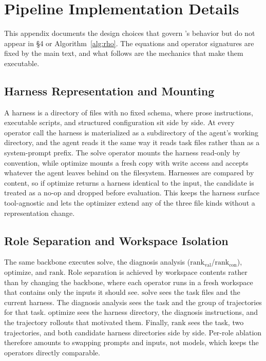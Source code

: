 \section{Pipeline Implementation Details}\label{app:pipeline}

 This appendix documents the design choices that govern \method{}'s behavior but do not appear in \S 4 or Algorithm~\ref{alg:rho}. The equations and operator signatures are fixed by the main text, and what follows are the mechanics that make them executable.

\subsection{Harness Representation and Mounting}

 A harness is a directory of files with no fixed schema, where prose instructions, executable scripts, and structured configuration sit side by side. At every operator call the harness is materialized as a subdirectory of the agent's working directory, and the agent reads it the same way it reads task files rather than as a system-prompt prefix. The $\mathrm{solve}$ operator mounts the harness read-only by convention, while $\mathrm{optimize}$ mounts a fresh copy with write access and accepts whatever the agent leaves behind on the filesystem. Harnesses are compared by content, so if $\mathrm{optimize}$ returns a harness identical to the input, the candidate is treated as a no-op and dropped before evaluation. This keeps the harness surface tool-agnostic and lets the optimizer extend any of the three file kinds without a representation change.

\subsection{Role Separation and Workspace Isolation}

 The same backbone executes $\mathrm{solve}$, the diagnosis analysis ($\mathrm{rank}_{\mathrm{val}}$/$\mathrm{rank}_{\mathrm{con}}$), $\mathrm{optimize}$, and $\mathrm{rank}$. Role separation is achieved by workspace contents rather than by changing the backbone, where each operator runs in a fresh workspace that contains only the inputs it should see. $\mathrm{solve}$ sees the task files and the current harness. The diagnosis analysis sees the task and the group of trajectories for that task. $\mathrm{optimize}$ sees the harness directory, the diagnosis instructions, and the trajectory rollouts that motivated them. Finally, $\mathrm{rank}$ sees the task, two trajectories, and both candidate harness directories side by side. Per-role ablation therefore amounts to swapping prompts and inputs, not models, which keeps the operators directly comparable.

